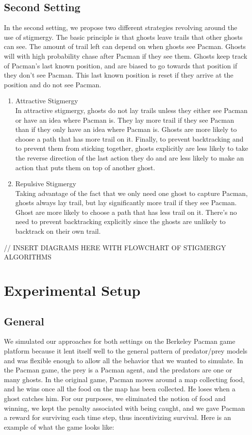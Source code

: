 \documentclass[11pt]{article}
\begin{document}
\begin{multicols}{2}
\subsection{Second Setting}
In the second setting, we propose two different strategies revolving around the use of stigmergy.  The basic principle is that ghosts leave trails that other ghosts can see. The amount of trail left can depend on when ghosts see Pacman.  Ghosts will with high probability chase after Pacman if they see them.  Ghosts keep track of Pacman's last known position, and are biased to go towards that position if they don't see Pacman.  This last known position is reset if they arrive at the position and do not see Pacman.

\begin{enumerate}[leftmargin=0.25cm]
	\item Attractive Stigmergy\\
 	In attractive stigmergy, ghosts do not lay trails unless they either see Pacman or have an idea where Pacman is.  They lay more trail if they see Pacman than if they only have an idea where Pacman is.  Ghosts are more likely to choose a path that has more trail on it.  Finally, to prevent backtracking and to prevent them from sticking together, ghosts explicitly are less likely to take the reverse direction of the last action they do and are less likely to make an action that puts them on top of another ghost.
	
	\item Repulsive Stigmergy\\
	Taking advantage of the fact that we only need one ghost to capture Pacman, ghosts always lay trail, but lay significantly more trail if they see Pacman.  Ghost are more likely to choose a path that has less trail on it.  There's no need to prevent backtracking explicitly since the ghosts are unlikely to backtrack on their own trail.
\end{enumerate}

// INSERT DIAGRAMS HERE WITH FLOWCHART OF STIGMERGY ALGORITHMS


\section{Experimental Setup}
\subsection{General}
We simulated our approaches for both settings on the Berkeley Pacman game platform because it lent itself well to the general pattern of predator/prey models and was flexible enough to allow all the behavior that we wanted to simulate. In the Pacman game, the prey is a Pacman agent, and the predators are one or many ghosts. In the original game, Pacman moves around a map collecting food, and he wins once all the food on the map has been collected. He loses when a ghost catches him. For our purposes, we eliminated the notion of food and winning, we kept the penalty associated with being caught, and we gave Pacman a reward for surviving each time step, thus incentivizing survival. Here is an example of what the game looks like: \\


\end{multicols}
\end{document}
